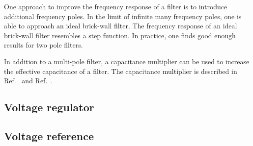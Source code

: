 One approach to improve the frequency response of a filter is to introduce additional frequency poles.
In the limit of infinite many frequency poles, one is able to approach an ideal brick-wall filter.
The frequency response of an ideal brick-wall filter resembles a step function.
In practice, one finds good enough results for two pole filters.

In addition to a multi-pole filter, a capacitance multiplier can be used to increase the effective capacitance of a filter.
The capacitance multiplier is described in Ref.~\cite[p.~536]{Hobbs11} and Ref.~\cite[p.~578]{Horowitz15}.

\subsection{Voltage regulator}

\subsection{Voltage reference}